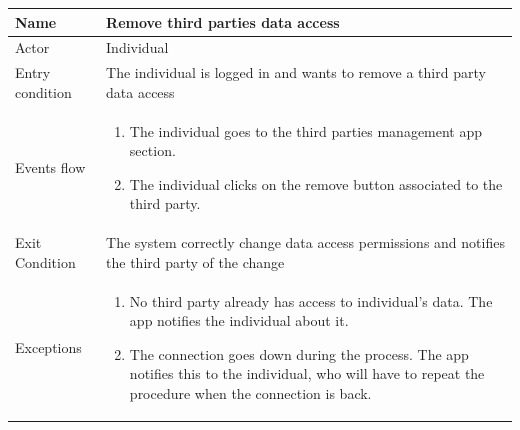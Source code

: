 \begin{table}[p]
\centering
\begin{tabular}{|l|p{11cm}|}
    \hline
    Name & Remove third parties data access
    \\ \hline
    Actor & Individual
    \\ \hline 
    Entry condition & The individual is logged in and wants to remove a third party data access
        \\ \hline
    Events flow &
    \begin{enumerate}
	\item The individual goes to the third parties management app section.
    \item The individual clicks on the remove button associated to the third party.
    \end{enumerate}
     \\ \hline
     Exit Condition & The system correctly change data access permissions and notifies the third party of the change
     \\
    \hline
    Exceptions &
        \begin{enumerate}
    \item No third party already has access to individual's data. The app notifies the individual about it.
    \item The connection goes down during the process. The app notifies this to the individual, who will have to repeat the procedure when the connection is back.
    \end{enumerate}
       \\
    \hline
\end{tabular}
\end{table}


